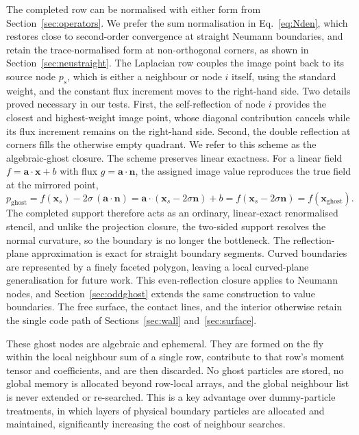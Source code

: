 \documentclass[preprint,review,12pt]{elsarticle}
\begin{document}
The completed row can be normalised with either form from Section~\ref{sec:operators}.
We prefer the sum normalisation in Eq.~\eqref{eq:Nden}, which restores close to second-order convergence at straight Neumann boundaries, and retain the trace-normalised form at non-orthogonal corners, as shown in Section~\ref{sec:neustraight}.
The Laplacian row couples the image point back to its source node $p_s$, which is either a neighbour or node $i$ itself, using the standard weight, and the constant flux increment moves to the right-hand side.
Two details proved necessary in our tests.
First, the self-reflection of node $i$ provides the closest and highest-weight image point, whose diagonal contribution cancels while its flux increment remains on the right-hand side.
Second, the double reflection at corners fills the otherwise empty quadrant.
We refer to this scheme as the algebraic-ghost closure.
The scheme preserves linear exactness.
For a linear field $f=\mathbf a\cdot\mathbf x+b$ with flux $g=\mathbf a\cdot\mathbf n$, the assigned image value reproduces the true field at the mirrored point,
\begin{equation}
  p_{\mathrm{ghost}}=f(\mathbf x_s)-2\sigma\,(\mathbf a\cdot\mathbf n)
  =\mathbf a\cdot(\mathbf x_s-2\sigma\mathbf n)+b
  =f(\mathbf x_s-2\sigma\mathbf n)=f(\mathbf x_{\mathrm{ghost}}).
  \label{eq:ghostexact}
\end{equation}
The completed support therefore acts as an ordinary, linear-exact renormalised stencil, and unlike the projection closure, the two-sided support resolves the normal curvature, so the boundary is no longer the bottleneck.
The reflection-plane approximation is exact for straight boundary segments.
Curved boundaries are represented by a finely faceted polygon, leaving a local curved-plane generalisation for future work.
This even-reflection closure applies to Neumann nodes, and Section~\ref{sec:oddghost} extends the same construction to value boundaries.
The free surface, the contact lines, and the interior otherwise retain the single code path of Sections~\ref{sec:wall} and~\ref{sec:surface}.

These ghost nodes are algebraic and ephemeral.
They are formed on the fly within the local neighbour sum of a single row, contribute to that row's moment tensor and coefficients, and are then discarded.
No ghost particles are stored, no global memory is allocated beyond row-local arrays, and the global neighbour list is never extended or re-searched.
This is a key advantage over dummy-particle treatments, in which layers of physical boundary particles are allocated and maintained, significantly increasing the cost of neighbour searches.
\end{document}
